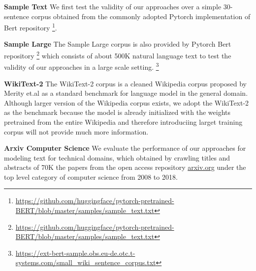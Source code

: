 


\noindent \textbf{Sample Text} 
We first test the validity of our approaches over a simple 30-sentence corpus
obtained from the commonly adopted Pytorch implementation of Bert repository \footnote{\url{https://github.com/huggingface/pytorch-pretrained-BERT/blob/master/samples/sample_text.txt}}.


\noindent \textbf{Sample Large}
The Sample Large corpus is also provided by Pytorch Bert repository  \footnote{\url{https://github.com/huggingface/pytorch-pretrained-BERT/blob/master/samples/sample_text.txt}}
which consists of about 500K natural language text to test the validity of our approaches in a large scale setting.
\footnote{\url{https://ext-bert-sample.obs.eu-de.otc.t-systems.com/small_wiki_sentence_corpus.txt}}

\noindent \textbf{WikiText-2} 
The WikiText-2 corpus is a cleaned Wikipedia corpus proposed by Merity et.al \cite{merity2016pointer} as a standard benchmark for language model in the general domain. 
Although larger version of the Wikipedia corpus exists, we adopt the WikiText-2 as the benchmark because the model is already initialized with the weights pretrained from the entire Wikipedia \cite{devlin2018bert} and therefore introduciing larget training corpus will not provide much more information.


\noindent \textbf{Arxiv Computer Science} We evaluate the performance of our approaches for modeling text for technical domains, which obtained by crawling titles and abstracts of 70K the papers from the open access repository \url{arxiv.org} under the top level category of computer science from 2008 to 2018. 


